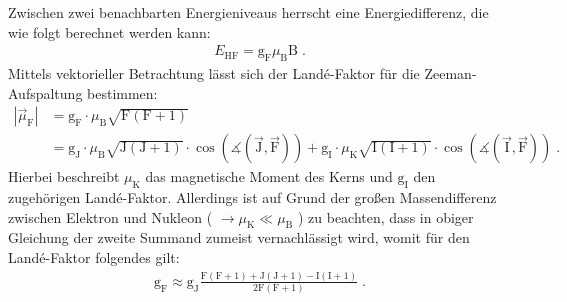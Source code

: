 \FloatBarrier
Zwischen zwei benachbarten Energieniveaus herrscht eine Energiedifferenz, die wie folgt berechnet werden kann:
\begin{align*}
    E_{\text{HF}} = \text{g}_{\text{F}} \mu_{\text{B}} \text{B} \; .
\end{align*}
Mittels vektorieller Betrachtung lässt sich der Landé-Faktor für die Zeeman-Aufspaltung bestimmen:
\begin{align*}
    |\vec{\mu}_{\text{F}}| &= \text{g}_{\text{F}} \cdot \mu_{\text{B}} \sqrt{\text{F} (\text{F}+1)} \\
    &=\text{g}_{\text{J}} \cdot \mu_{\text{B}} \sqrt{\text{J} (\text{J} + 1)} \cdot \cos\left(\measuredangle(\vec{\text{J}},\vec{\text{F}})\right) +
    \text{g}_{\text{I}} \cdot \mu_{\text{K}} \sqrt{ \text{I}(\text{I}+1) } \cdot \cos\left(\measuredangle(\vec{\text{I}},\vec{\text{F}})\right) \; .
\end{align*}
Hierbei beschreibt $\mu_{\text{K}}$ das magnetische Moment des Kerns und $\text{g}_{\text{I}}$ den zugehörigen Landé-Faktor.
Allerdings ist auf Grund der großen Massendifferenz zwischen Elektron und Nukleon ( $\rightarrow \mu_{\text{K}} \ll \mu_{\text{B}} $ ) zu beachten, dass in obiger Gleichung der zweite Summand zumeist vernachlässigt wird, womit für den Landé-Faktor folgendes gilt:
\begin{align}
    \text{g}_{\text{F}} \approx \text{g}_{\text{J}} \frac{\text{F} (\text{F} + 1)+\text{J} (\text{J} + 1) - \text{I}(\text{I} + 1)}{2\text{F}(\text{F}+1)} \; .
	\label{eq:La-Fa.gf}
\end{align}

